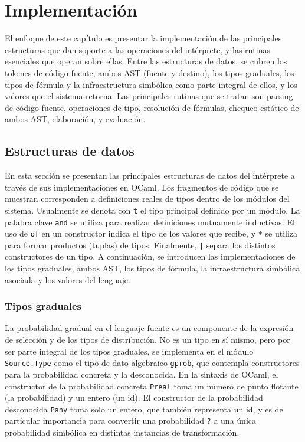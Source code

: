 

\chapter{Implementación}
\label{sec:implementacion}
El enfoque de este capítulo es presentar la implementación de las principales estructuras que dan soporte a las operaciones del intérprete, y las rutinas esenciales que operan sobre ellas. Entre las estructuras de datos, se cubren los tokenes de código fuente, ambos AST (fuente y destino), los tipos graduales, los tipos de fórmula y la infraestructura simbólica como parte integral de ellos, y los valores que el sistema retorna. Las principales rutinas que se tratan son parsing de código fuente, operaciones de tipo, resolución de fórmulas, chequeo estático de ambos AST, elaboración,  y evaluación.

\section{Estructuras de datos}


En esta sección se presentan las principales estructuras de datos del
intérprete a través de sus implementaciones en OCaml. Los
fragmentos de código que se muestran corresponden a definiciones
reales de tipos dentro de los módulos del sistema. Usualmente se
denota con \verb|t| el tipo principal definido por un módulo. La
palabra clave \verb|and| se utiliza para realizar definiciones
mutuamente inductivas. El uso de \verb|of| en un constructor indica el
tipo de los valores que recibe, y \verb|*| se utiliza para formar
productos (tuplas) de tipos. Finalmente, \lstinline{|} separa los
distintos constructores de un tipo. A continuación, se introducen las
implementaciones de los tipos graduales, ambos AST, los tipos de
fórmula, la infraestructura simbólica asociada y los valores del
lenguaje.

\subsection{Tipos graduales}

La probabilidad gradual en el lenguaje fuente es un componente de la expresión de selección y de los tipos de distribución. No es un tipo en sí mismo, pero por ser parte integral de los tipos graduales, se implementa en el módulo \verb|Source.Type| como el tipo de dato  algebraico \verb|gprob|, que contempla constructores para la probabilidad concreta y la desconocida. En la sintaxis de OCaml, el constructor de la probabilidad concreta \verb|Preal| toma un número de punto flotante (la probabilidad) y un entero (un id). El constructor de la probabilidad desconocida \verb|Pany| toma solo un entero, que también representa un id, y es de particular importancia para convertir una probabilidad \verb|?| a una única probabilidad simbólica en distintas instancias de transformación.

